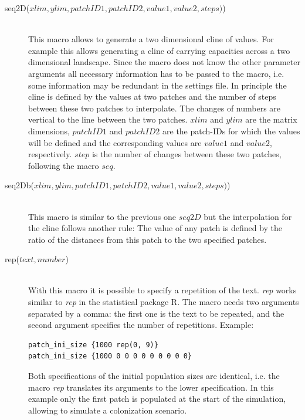 \documentclass[letterpaper,12pt,oneside]{book}
\begin{document}
\begin{description}
\item[seq2D($xlim, ylim, patchID1, patchID2, value1, value2, steps)$)]\hspace*{\fill}\\
This macro allows to generate a two dimensional cline of values. For example this allows generating a cline of carrying capacities across a two dimensional landscape. Since the macro does not know the other parameter arguments all necessary information has to be passed to the macro, i.e. some information may be redundant in the settings file. In principle the cline is defined by the values at two patches and the number of steps between these two patches to interpolate. The changes of numbers are vertical to the line between the two patches. $xlim$ and $ylim$ are the matrix dimensions, $patchID1$ and $patchID2$ are the patch-IDs for which the values will be defined and the corresponding values are $value1$ and $value2$, respectively. $step$ is the number of changes between these two patches, following the macro $seq$.

\item[seq2Db($xlim, ylim, patchID1, patchID2, value1, value2, steps)$)]\hspace*{\fill}\\
This macro is similar to the previous one $seq2D$ but the interpolation for the cline follows another rule: The value of any patch is defined by the ratio of the distances from this patch to the two specified patches.

\item[rep($text, number$)]\hspace*{\fill}\\
With this macro it is possible to specify a repetition of the text. \textit{rep} works similar to \textit{rep} in the statistical package R. The macro needs two arguments separated by a comma: the first one is the text to be repeated, and the second argument specifies the number of repetitions. Example:
\begin{lstlisting}[frame=single]
patch_ini_size {1000 rep(0, 9)}
patch_ini_size {1000 0 0 0 0 0 0 0 0 0}
\end{lstlisting}
Both specifications of the initial population sizes are identical, i.e. the macro \textit{rep} translates its arguments to the lower specification. In this example only the first patch is populated at the start of the simulation, allowing to simulate a colonization scenario. 


\end{description}
\end{document}

